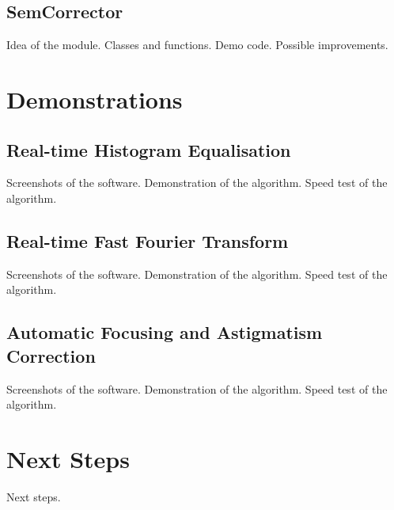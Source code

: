 \documentclass[conference]{IEEEtran}
\begin{document}
\subsection{SemCorrector}
Idea of the module.
Classes and functions.
Demo code.
Possible improvements.

\section{Demonstrations}
\subsection{Real-time Histogram Equalisation}
Screenshots of the software.
Demonstration of the algorithm.
Speed test of the algorithm.

\subsection{Real-time Fast Fourier Transform}
Screenshots of the software.
Demonstration of the algorithm.
Speed test of the algorithm.

\subsection{Automatic Focusing and Astigmatism Correction}
Screenshots of the software.
Demonstration of the algorithm.
Speed test of the algorithm.

\section{Next Steps}
Next steps.
\end{document}

